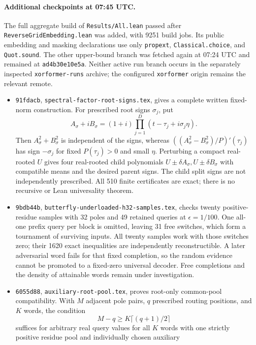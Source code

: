 \documentclass[11pt]{article}
\begin{document}
\paragraph{Additional checkpoints at 07:45 UTC.}
The full aggregate build of \texttt{Results/All.lean} passed after
\texttt{ReverseGridEmbedding.lean} was added, with 9251 build jobs.
Its public embedding and masking declarations use only
\texttt{propext}, \texttt{Classical.choice}, and \texttt{Quot.sound}.
The other upper-bound branch was fetched again at 07:24 UTC and
remained at \texttt{ad4b30e10e5a}. Neither active run branch occurs
in the separately inspected \texttt{xorformer-runs} archive; the
configured \texttt{xorformer} origin remains the relevant remote.
\begin{itemize}
\item \texttt{91fdacb}, \texttt{spectral-factor-root-signs.tex},
gives a complete written fixed-norm construction. For prescribed
root signs $\sigma_j$, put
\[
 A_\sigma+iB_\sigma=(1+i)\prod_{j=1}^D
                    (t-\tau_j+i\sigma_j\eta).
\]
Then $A_\sigma^2+B_\sigma^2$ is independent of the signs, whereas
$( (A_\sigma^2-B_\sigma^2)/P)'(\tau_j)$ has sign $-\sigma_j$
for fixed $P(\tau_j)>0$ and small $\eta$. Perturbing a compact
real-rooted $U$ gives four real-rooted child polynomials
$U\pm\delta A_\sigma,U\pm\delta B_\sigma$ with compatible means
and the desired parent signs. The child split signs are not
independently prescribed. All 510 finite certificates are exact;
there is no recursive or Lean universality theorem.
\item \texttt{9bdb44b},
\texttt{butterfly-underloaded-h32-samples.tex}, checks twenty
positive-residue samples with 32 poles and 49 retained queries at
$\epsilon=1/100$. One all-one prefix query per block is omitted,
leaving 31 free switches, which form a tournament of surviving inputs.
All twenty samples work with those switches zero; their 1620 exact
inequalities are independently reconstructible. A later adversarial
word fails for that fixed completion, so the random evidence cannot
be promoted to a fixed-zero universal decoder. Free completions and
the density of attainable words remain under investigation.
\item \texttt{6055d88}, \texttt{auxiliary-root-pool.tex}, proves
root-only common-pool compatibility. With $M$ adjacent pole pairs,
$q$ prescribed routing positions, and $K$ words, the condition
\[
 M-q\geq K\lceil(q+1)/2\rceil
\]
suffices for arbitrary real query values for all $K$ words with one
strictly positive residue pool and individually chosen auxiliary

\end{itemize}
\end{document}

